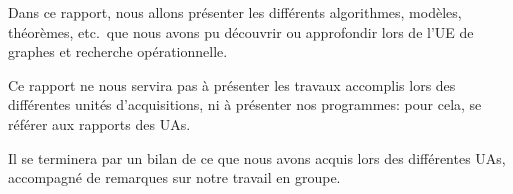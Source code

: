 
Dans ce rapport, nous allons présenter les différents algorithmes, modèles,
théorèmes, etc.\  que nous avons pu découvrir ou approfondir lors de l'UE de
graphes et recherche opérationnelle.

Ce rapport ne nous servira pas à présenter les travaux accomplis lors
des différentes unités d'acquisitions, ni à présenter nos programmes: pour
cela, se référer aux rapports des UAs.

Il se terminera par un bilan de ce que nous avons acquis lors des différentes
UAs, accompagné de remarques sur notre travail en groupe.
